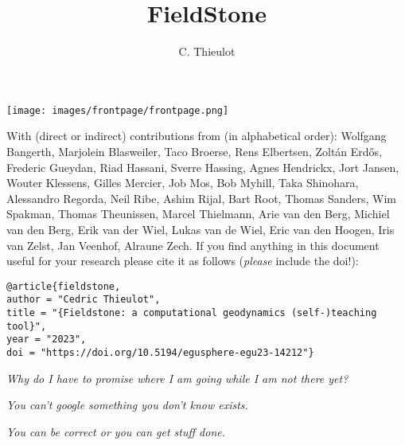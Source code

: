 \documentclass[a4paper,12pt]{report}
\title{FieldStone}
\author{C. Thieulot}
\begin{document}
\thispagestyle{empty}
\texttt{[image: images/frontpage/frontpage.png]}

{\scriptsize With (direct or indirect) contributions from (in alphabetical order): 
Wolfgang Bangerth, 
Marjolein Blasweiler,
Taco Broerse,
Rens Elbertsen,
Zolt{\'a}n Erd{\H{o}}s, 
Frederic Gueydan,
Riad Hassani,
Sverre Hassing,
Agnes Hendrickx,
Jort Jansen,
Wouter Klessens,
Gilles Mercier,
Job Mos, 
Bob Myhill,
Taka Shinohara, 
Alessandro Regorda,
Neil Ribe,
Ashim Rijal,
Bart Root,
Thomas Sanders,
Wim Spakman,
Thomas Theunissen,
Marcel Thielmann,
Arie van den Berg,
Michiel van den Berg,
Erik van der Wiel, 
Lukas van de Wiel, 
Eric van den Hoogen, 
Iris van Zelst,
Jan Veenhof,
Alraune Zech.}
\newpage
If you find anything in this document useful for your research please cite it 
as follows ({\it please} include the doi!):

\begin{verbatim}
@article{fieldstone,
author = "Cedric Thieulot",
title = "{Fieldstone: a computational geodynamics (self-)teaching tool}",
year = "2023",
doi = "https://doi.org/10.5194/egusphere-egu23-14212"}
\end{verbatim}

\vspace{7cm}

\begin{center}
{\sl Why do I have to promise where I am going while I am not there yet?}

\vspace{1cm}

{\sl You can't google something you don't know exists.}

\vspace{1cm}

{\sl You can be correct or you can get stuff done.}
\end{center}

\clearpage
\tableofcontents

\end{document}
